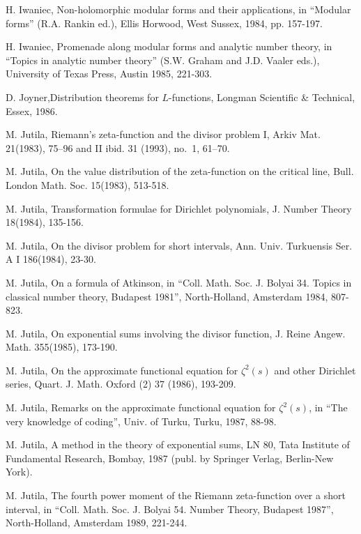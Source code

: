 \begin{thebibliography}{99}
 H. Iwaniec, Non-holomorphic modular forms and their applications, in ``Modular forms'' (R.A. Rankin ed.), Ellis Horwood, West Sussex, 1984, pp. 157-197.

 H. Iwaniec, Promenade along modular forms and analytic number theory, in ``Topics in analytic number theory'' (S.W. Graham and J.D. Vaaler eds.), University of Texas Press, Austin 1985, 221-303.

 D. Joyner,\pageoriginale Distribution theorems for $L$-functions, Longman Scientific \& Technical, Essex, 1986.

 M. Jutila, Riemann's zeta-function and the divisor problem I, Arkiv Mat. 21(1983), 75--96 and II ibid.  31 (1993), no.~1, 61--70.

 M. Jutila, On the value distribution of the zeta-function on the critical line, Bull. London Math. Soc. 15(1983), 513-518.

 M. Jutila, Transformation formulae for Dirichlet polynomials, J. Number Theory 18(1984), 135-156.

 M. Jutila, On the divisor problem for short intervals, Ann. Univ. Turkuensis Ser. A I 186(1984), 23-30.

 M. Jutila, On a formula of Atkinson, in ``Coll. Math. Soc. J. Bolyai 34. Topics in classical number theory, Budapest 1981'', North-Holland, Amsterdam 1984, 807-823.

 M. Jutila, On exponential sums involving the divisor function, J. Reine Angew. Math. 355(1985), 173-190.

 M. Jutila, On the approximate functional equation for $\zeta^2(s)$ and other Dirichlet series, Quart. J. Math. Oxford (2) 37 (1986), 193-209.

 M. Jutila, Remarks on the approximate functional equation for $\zeta^2(s)$, in ``The very knowledge of coding'', Univ. of Turku, Turku, 1987, 88-98.

 M. Jutila, A method in the theory of exponential sums, LN 80, Tata Institute of Fundamental Research, Bombay, 1987 (publ. by Springer Verlag, Berlin-New York).

 M. Jutila, The fourth power moment of the Riemann zeta-function over a short interval, in ``Coll. Math. Soc. J. Bolyai 54. Number Theory, Budapest 1987'', North-Holland, Amsterdam 1989, 221-244.


\end{thebibliography}
